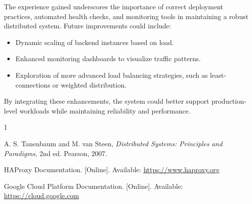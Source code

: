 \documentclass[conference]{IEEEtran}
\begin{document}
The experience gained underscores the importance of correct deployment practices, automated health checks, and monitoring tools in maintaining a robust distributed system. Future improvements could include:

\begin{itemize}
    \item Dynamic scaling of backend instances based on load.
    \item Enhanced monitoring dashboards to visualize traffic patterns.
    \item Exploration of more advanced load balancing strategies, such as least-connections or weighted distribution.
\end{itemize}

By integrating these enhancements, the system could better support production-level workloads while maintaining reliability and performance.

\begin{thebibliography}{1}

A. S. Tanenbaum and M. van Steen, \emph{Distributed Systems: Principles and Paradigms}, 2nd ed. Pearson, 2007.

HAProxy Documentation. [Online]. Available: \url{https://www.haproxy.org}

Google Cloud Platform Documentation. [Online]. Available: \url{https://cloud.google.com}

\end{thebibliography}
\end{document}

